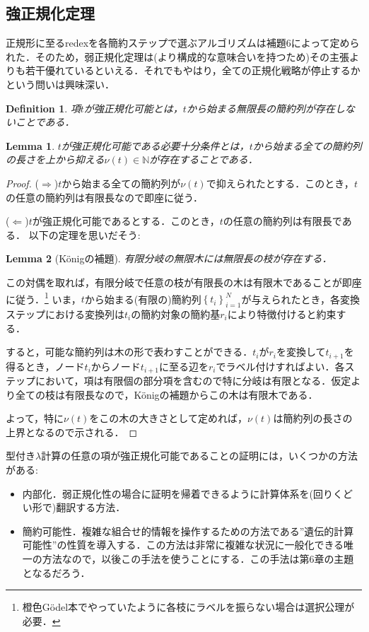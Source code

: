 \documentclass[a4paper,10pt,platex, dvipdfmx]{jsarticle}
\newtheorem{definition}{Definition}
\newtheorem{lemma}{Lemma}
\begin{document}
\subsection{強正規化定理}
正規形に至るredexを各簡約ステップで選ぶアルゴリズムは補題6によって定められた．そのため，弱正規化定理は(より構成的な意味合いを持つため)その主張よりも若干優れているといえる．それでもやはり，全ての正規化戦略が停止するかという問いは興味深い．
\begin{definition}
項$t$が強正規化可能とは，$t$から始まる無限長の簡約列が存在しないことである．
\end{definition}
\begin{lemma}
$t$が強正規化可能である必要十分条件とは，$t$から始まる全ての簡約列の長さを上から抑える$\nu(t)\in\mathbb{N}$が存在することである．
\end{lemma}
\begin{proof}
($\Longrightarrow$)$t$から始まる全ての簡約列が$\nu(t)$で抑えられたとする．このとき，$t$の任意の簡約列は有限長なので即座に従う．

($\Longleftarrow$)$t$が強正規化可能であるとする．このとき，$t$の任意の簡約列は有限長である．
以下の定理を思いだそう:
\begin{lemma}[K\"onigの補題]
有限分岐の無限木には無限長の枝が存在する．
\end{lemma}
この対偶を取れば，有限分岐で任意の枝が有限長の木は有限木であることが即座に従う．\footnote{橙色G\"odel本でやっていたように各枝にラベルを振らない場合は選択公理が必要．}
いま，$t$から始まる(有限の)簡約列$\left\{t_{i}\right\}_{i = 1}^{N}$が与えられたとき，各変換ステップにおける変換列は$t_{i}$の簡約対象の簡約基$r_{i}$により特徴付けると約束する．

すると，可能な簡約列は木の形で表わすことができる．$t_{i}$が$r_{i}$を変換して$t_{i +1}$を得るとき，ノード$t_{i}$からノード$t_{i+1}$に至る辺を$r_{i}$でラベル付けすればよい．各ステップにおいて，項は有限個の部分項を含むので特に分岐は有限となる．仮定より全ての枝は有限長なので，K\"onigの補題からこの木は有限木である．

よって，特に$\nu(t)$をこの木の大きさとして定めれば，$\nu(t)$は簡約列の長さの上界となるので示される．
\end{proof}
型付き$\lambda$計算の任意の項が強正規化可能であることの証明には，いくつかの方法がある:\begin{itemize}
\item 内部化．弱正規化性の場合に証明を帰着できるように計算体系を(回りくどい形で)翻訳する方法．
\item 簡約可能性．複雑な組合せ的情報を操作するための方法である''遺伝的計算可能性''の性質を導入する．この方法は非常に複雑な状況に一般化できる唯一の方法なので，以後この手法を使うことにする．この手法は第6章の主題となるだろう．
\end{itemize}
\pagebreak
\end{document}
